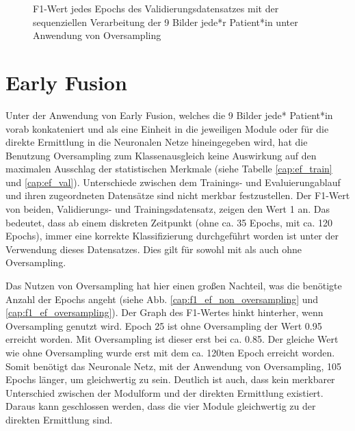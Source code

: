 \begin{figure}[b]\centering
\makebox[0pt]{}
\caption[F1-Wert jedes Epochs des Validierungsdatensatzes mit der sequenziellen Verarbeitung unter Anwendung von Oversampling]{F1-Wert jedes Epochs des Validierungsdatensatzes mit der sequenziellen Verarbeitung der 9 Bilder jede*r Patient*in unter Anwendung von Oversampling}\label{cap:f1_sequential_oversampling}
\end{figure}\label{fig:f1_sequential_oversampling}





\clearpage
\section{Early Fusion}\label{earlyfusion}

Unter der Anwendung von Early Fusion, welches die 9 Bilder jede* Patient*in vorab konkateniert und als eine Einheit in die jeweiligen Module oder für die direkte Ermittlung in die Neuronalen Netze hineingegeben wird, hat die Benutzung Oversampling zum Klassenausgleich keine Auswirkung auf den maximalen Ausschlag der statistischen Merkmale (siehe Tabelle \ref{cap:ef_train} und \ref{cap:ef_val}). Unterschiede zwischen dem Trainings- und Evaluierungablauf und ihren zugeordneten Datensätze sind nicht merkbar festzustellen. Der F1-Wert von beiden, Validierungs- und Trainingsdatensatz, zeigen den Wert 1 an. Das bedeutet, dass ab einem diskreten Zeitpunkt (ohne ca. 35 Epochs, mit ca. 120 Epochs), immer eine korrekte Klassifizierung durchgeführt worden ist unter der Verwendung dieses Datensatzes. Dies gilt für sowohl mit als auch ohne Oversampling.

Das Nutzen von Oversampling hat hier einen großen Nachteil, was die benötigte Anzahl der Epochs angeht (siehe Abb. \ref{cap:f1_ef_non_oversampling} und \ref{cap:f1_ef_oversampling}). Der Graph des F1-Wertes hinkt hinterher, wenn Oversampling genutzt wird. Epoch 25 ist ohne Oversampling der Wert 0.95 erreicht worden. Mit Oversampling ist dieser erst bei ca. 0.85. Der gleiche Wert wie ohne Oversampling wurde erst mit dem ca. 120ten Epoch erreicht worden. Somit benötigt das Neuronale Netz, mit der Anwendung von Oversampling, 105 Epochs länger, um gleichwertig zu sein. Deutlich ist auch, dass kein merkbarer Unterschied zwischen der Modulform und der direkten Ermittlung existiert. Daraus kann geschlossen werden, dass die vier Module gleichwertig zu der direkten Ermittlung sind.

